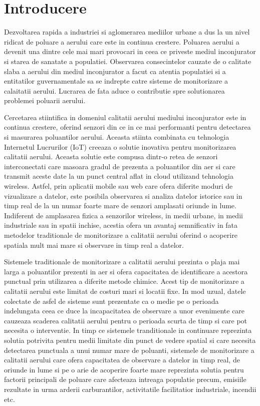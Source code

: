 \chapter{Introducere}\label{ch:intro}
\pagestyle{fancy}
Dezvoltarea rapida a industriei si aglomerarea mediilor urbane a dus la un nivel ridicat de poluare a aerului care este in continua crestere. Poluarea aerului 
a devenit una dintre cele mai mari provocari in ceea ce priveste mediul inconjurator si starea de sanatate a populatiei. Observarea consecintelor cauzate de 
o calitate slaba a aerului din mediul inconjurator a facut ca atentia populatiei si a entitatilor guvernamentale sa se indrepte catre sisteme de monitorizare 
a calaitatii aerului. Lucrarea de fata aduce o contributie spre solutionarea problemei poluarii aerului.

Cercetarea stiintifica in domeniul calitatii aerului mediului inconjurator este in continua crestere, oferind senzori din ce in ce mai performanti pentru 
detectarea si masurarea poluantilor aerului. Aceasta stiinta combinata cu tehnologia Internetul Lucrurilor (IoT) creeaza o solutie inovativa pentru 
monitorizarea calitatii aerului. Aceasta solutie este compusa dintr-o retea de senzori interconectati care masoara gradul de prezenta a poluantilor din aer si 
care transmit aceste date la un punct central aflat in cloud utilizand tehnologia wireless. Astfel, prin aplicatii mobile sau web care ofera diferite moduri de 
vizualizare a datelor, este posibila observarea si analiza datelor istorice sau in timp real de la un numar foarte mare de senzori amplasati oriunde in lume. 
Indiferent de amplasarea fizica a senzorilor wireless, in medii urbane, in medii industriale sau in spatii inchise, acestia ofera un avantaj semnificativ in 
fata metodelor traditionale de monitorizare a calitatii aerului oferind o acoperire spatiala mult mai mare si observare in timp real a datelor.

Sistemele traditionale de monitorizare a calitatii aerului prezinta o plaja mai larga a poluantilor prezenti in aer si ofera capacitatea de identificare a acestora 
punctual prin utilizarea a diferite metode chimice. Acest tip de monitorizare a calitatii aerului este limitat de costuri mari si locatii fixe. In mod uzual, 
datele colectate de asfel de sisteme sunt prezentate ca o medie pe o perioada indelungata ceea ce duce la incapacitatea de observare a unor evenimente care cauzeaza 
scaderea calitatii aerului pentru o perioada scurta de timp si care pot necesita o interventie. In timp ce sistemele tranditionale in continuare reprezinta solutia potrivita 
pentru medii limitate din punct de vedere spatial si care necesita detectarea punctuala a unui numar mare de poluanti, sistemele de monitorizare a calitatii aerului 
care ofera capacitatea de observare a datelor in timp real, de oriunde in lume si pe o arie de acoperire foarte mare reprezinta solutia pentru factorii principali 
de poluare care afecteaza intreaga populatie precum, emisiile rezultate in urma arderii carburantilor, activitatile facilitatior industriale, incendii etc.


